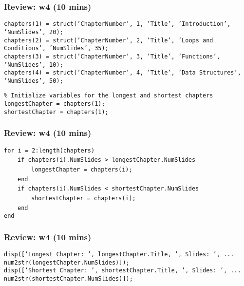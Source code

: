\documentclass[
	11pt, %
]{beamer}
\begin{document}

\begin{frame}
	\frametitle{Review: w4 (10 mins)}

	\texttt{chapters(1) = struct('ChapterNumber', 1, 'Title', 'Introduction', 'NumSlides', 20); } \\
    \texttt{chapters(2) = struct('ChapterNumber', 2, 'Title', 'Loops and Conditions', 'NumSlides', 35); } \\
    \texttt{chapters(3) = struct('ChapterNumber', 3, 'Title', 'Functions', 'NumSlides', 10); } \\
    \texttt{chapters(4) = struct('ChapterNumber', 4, 'Title', 'Data Structures', 'NumSlides', 50); } \\
    \vspace{0.3cm}

\texttt{\% Initialize variables for the longest and shortest chapters} \\
    \texttt{longestChapter = chapters(1);} \\
    \texttt{shortestChapter = chapters(1);} \\
    
\end{frame}


\begin{frame}
	\frametitle{Review: w4 (10 mins)}

    \texttt{for i = 2:length(chapters)} \\
    \ \ \ \ \texttt{if chapters(i).NumSlides > longestChapter.NumSlides} \\
    \ \ \ \ \ \ \ \ \texttt{longestChapter = chapters(i);} \\
    \ \ \ \ \texttt{end} \\
    \ \ \ \ \texttt{if chapters(i).NumSlides < shortestChapter.NumSlides} \\
    \ \ \ \ \ \ \ \ \texttt{shortestChapter = chapters(i);} \\
    \ \ \ \ \texttt{end} \\
    \texttt{end} \\
    
\end{frame}


\begin{frame}
	\frametitle{Review: w4 (10 mins)}
 
    \texttt{disp(['Longest Chapter: ', longestChapter.Title, ', Slides: ', ... } \\
    \texttt{num2str(longestChapter.NumSlides)]);} \\
    \texttt{disp(['Shortest Chapter: ', shortestChapter.Title, ', Slides: ', ... } \\
    \texttt{num2str(shortestChapter.NumSlides)]);} \\
    
\end{frame}
\end{document}
